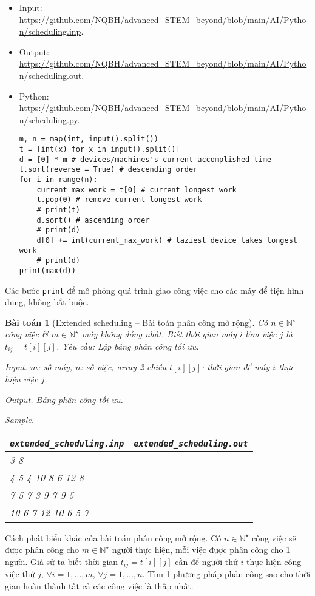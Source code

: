 \documentclass{article}
\newtheorem{baitoan}{Bài toán}
\begin{document}
\begin{itemize}
	\item Input: \url{https://github.com/NQBH/advanced_STEM_beyond/blob/main/AI/Python/scheduling.inp}.
	\item Output: \url{https://github.com/NQBH/advanced_STEM_beyond/blob/main/AI/Python/scheduling.out}.
	\item Python: \url{https://github.com/NQBH/advanced_STEM_beyond/blob/main/AI/Python/scheduling.py}.
\begin{verbatim}
m, n = map(int, input().split())
t = [int(x) for x in input().split()]
d = [0] * m # devices/machines's current accomplished time
t.sort(reverse = True) # descending order
for i in range(n):
    current_max_work = t[0] # current longest work
    t.pop(0) # remove current longest work
    # print(t)
    d.sort() # ascending order
    # print(d)
    d[0] += int(current_max_work) # laziest device takes longest work
    # print(d)
print(max(d))
\end{verbatim}
\end{itemize}
Các bước {\tt print} để mô phỏng quá trình giao công việc cho các máy để tiện hình dung, không bắt buộc.

\begin{baitoan}[Extended scheduling -- Bài toán phân công mở rộng]
	Có $n\in\mathbb{N}^\star$ công việc \& $m\in\mathbb{N}^\star$ máy không đồng nhất. Biết thời gian máy $i$ làm việc $j$ là $t_{ij} = t[i][j]$. Yêu cầu: Lập bảng phân công tối ưu.
	\item {\sf Input.} $m$: số máy, $n$: số việc, array 2 chiều $t[i][j]$: thời gian để máy $i$ thực hiện việc $j$.
	\item {\sf Output.} Bảng phân công tối ưu.
	\item {\sf Sample.}
	\begin{table}[H]
		\centering
		\begin{tabular}{|l|l|}
			\hline
			\verb|extended_scheduling.inp| & \verb|extended_scheduling.out| \\
			\hline
			3 8 &  \\
			4 5 4 10 8 6 12 8 &  \\
			7 5 7 3 9 7 9 5 &  \\
			10 6 7 12 10 6 5 7 &  \\
			\hline
		\end{tabular}
	\end{table}
\end{baitoan}
{\sf Cách phát biểu khác của bài toán phân công mở rộng.} Có $n\in\mathbb{N}^\star$ công việc sẽ được phân công cho $m\in\mathbb{N}^\star$ người thực hiện, mỗi việc được phân công cho 1 người. Giả sử ta biết thời gian $t_{ij} = t[i][j]$ cần để người thứ $i$ thực hiện công việc thứ $j$, $\forall i = 1,\ldots,m$, $\forall j = 1,\ldots,n$. Tìm 1 phương pháp phân công sao cho thời gian hoàn thành tất cả các công việc là thấp nhất.
\end{document}
